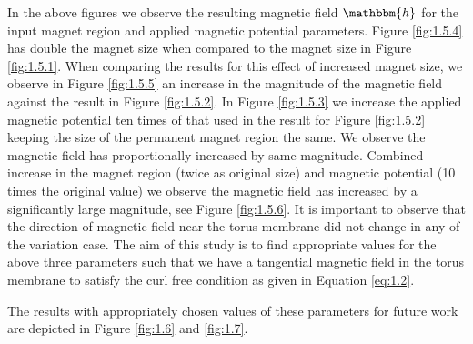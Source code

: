 \documentclass[11pt,a4paper,final]{article}
\begin{document}
In the above figures we observe the resulting magnetic field $\mathbbm{h}$ for the input magnet region and applied magnetic potential parameters. Figure \eqref{fig:1.5.4} has double the magnet size when compared to the magnet size in Figure \eqref{fig:1.5.1}. When comparing the results for this effect of increased magnet size, we observe in Figure \eqref{fig:1.5.5} an increase in the magnitude of the magnetic field against the result in Figure \eqref{fig:1.5.2}. In Figure \eqref{fig:1.5.3} we increase the applied magnetic potential ten times of that used in the result for Figure \eqref{fig:1.5.2} keeping the size of the permanent magnet region the same. We observe the magnetic field has proportionally increased by same magnitude. Combined increase in the magnet region (twice as original size) and magnetic potential (10 times the original value) we observe the magnetic field has increased by a significantly large magnitude, see Figure \eqref{fig:1.5.6}. It is important to observe that the direction of magnetic field near the torus membrane did not change in any of the variation case. The aim of this study is to find appropriate values for the above three parameters such that we have a tangential magnetic field in the torus membrane to satisfy the curl free condition as given in Equation \eqref{eq:1.2}. \par 

The results with appropriately chosen values of these parameters for future work are depicted in Figure \eqref{fig:1.6} and \eqref{fig:1.7}.
\end{document}

